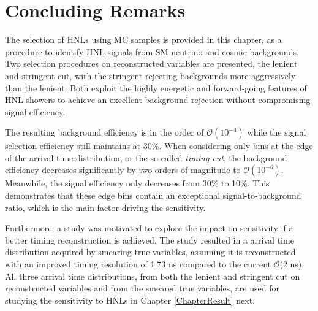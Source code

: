 \section{Concluding Remarks}
\label{sec:select_conclude}

The selection of HNLs using MC samples is provided in this chapter, as a procedure to identify HNL signals from SM neutrino and cosmic backgrounds.
Two selection procedures on reconstructed variables are presented, the lenient and stringent cut, with the stringent rejecting backgrounds more aggressively than the lenient.
Both exploit the highly energetic and forward-going features of HNL showers to achieve an excellent background rejection without compromising signal efficiency.

The resulting background efficiency is in the order of $\mathcal{O}(10^{-4})$ while the signal selection efficiency still maintains at 30\%. 
When considering only bins at the edge of the arrival time distribution, or the so-called \textit{timing cut}, the background efficiency decreases significantly by two orders of magnitude to $\mathcal{O}(10^{-6})$.
Meanwhile, the signal efficiency only decreases from 30\% to 10\%. 
This demonstrates that these edge bins contain an exceptional signal-to-background ratio, which is the main factor driving the sensitivity.

Furthermore, a study was motivated to explore the impact on sensitivity if a better timing reconstruction is achieved.
The study resulted in a arrival time distribution acquired by smearing true variables, assuming it is reconstructed with an improved timing resolution of 1.73 ns compared to the current $\mathcal{O}$(2 ns).
All three arrival time distributions, from both the lenient and stringent cut on reconstructed variables and from the smeared true variables, are used for studying the sensitivity to HNLs in Chapter \ref{ChapterResult} next. 


